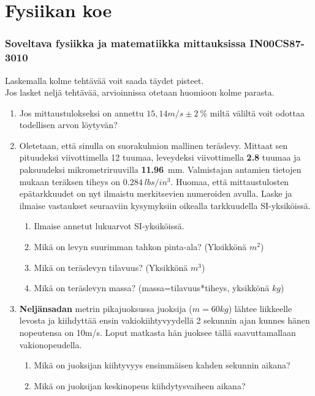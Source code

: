 \documentclass[12pt]{article}
\begin{document}
\newpage

\section{Fysiikan koe}
\subsubsection*{Soveltava fysiikka ja matematiikka mittauksissa IN00CS87-3010}

Laskemalla kolme tehtävää voit saada täydet pisteet.\\ Jos lasket neljä tehtävää, arvioinnissa otetaan huomioon kolme parasta.

\begin{enumerate}
\item Jos mittaustulokseksi on annettu $15,14m/s\pm 2~\%$ miltä väliltä voit odottaa todellisen arvon löytyvän?
\item Oletetaan, että sinulla on suorakulmion mallinen teräslevy. Mittaat sen pituudeksi viivottimella 12 tuumaa, leveydeksi viivottimella \textbf{2.8} tuumaa ja paksuudeksi mikrometriruuvilla \textbf{11.96}~mm. Valmistajan antamien tietojen mukaan teräksen tiheys on  $0.284~lbs/in^3$. Huomaa, että mittaustulosten epätarkkuudet on nyt ilmaistu merkitsevien numeroiden avulla. Laske ja ilmaise vastaukset seuraaviin kysymyksiin oikealla tarkkuudella SI-yksiköissä.
\begin{enumerate}
\item Ilmaise annetut lukuarvot SI-yksiköissä.
\item Mikä on levyn suurimman tahkon pinta-ala? (Yksikkönä $m^2$)
\item Mikä on teräslevyn tilavuus? (Yksikkönä $m^3$)
\item Mikä on teräslevyn massa?
(massa=tilavuus*tiheys, yksikkönä $kg$)
\end{enumerate}
\item \textbf{Neljänsadan} metrin pikajuoksussa juoksija ($m=60kg$) lähtee liikkeelle levosta ja kiihdyttää ensin vakiokiihtyvyydellä 2 sekunnin ajan kunnes hänen nopeutensa on 10m/s. Loput matkasta hän juoksee tällä saavuttamallaan vakionopeudella.
\begin{enumerate}
\item Mikä on juoksijan kiihtyvyys ensimmäisen kahden sekunnin aikana?
\item Mikä on juoksijan keskinopeus kiihdytysvaiheen aikana?

\end{enumerate}
\end{enumerate}
\end{document}
